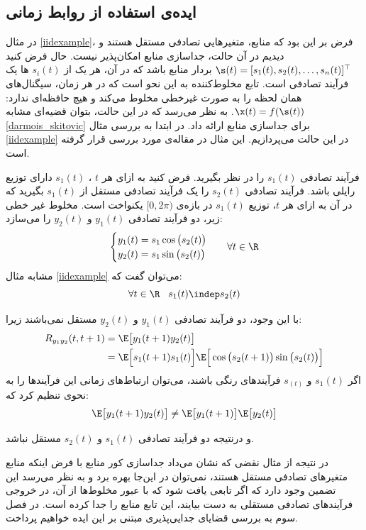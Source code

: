 \subsection{ایده‌ی استفاده از روابط زمانی}

در مثال
\eqref{iidexample}،
فرض بر این بود که منابع، متغیر‌هایی تصادفی مستقل هستند و دیدیم در آن حالت، جداسازی منابع امکان‌پذیر نیست. حال فرض کنید 
$\s(t) = [s_1(t), s_2(t), \dots, s_n(t)]^\top$
بردار منابع باشد که در آن، هر یک از
$s_i(t)$
ها یک فرآیند تصادفی است. تابع مخلوط‌کننده به این نحو است که در هر زمان، سیگنال‌های همان لحظه را به صورت غیرخطی مخلوط می‌کند و هیچ حافظه‌ای ندارد:
$\x(t) = f(\s(t))$.
به نظر می‌رسد که در این حالت، بتوان قضیه‌ای مشابه
\eqref{darmois_skitovic}
برای جداسازی منابع ارائه داد. در ابتدا به بررسی مثال 
\eqref{iidexample}
در این حالت می‌پردازیم. این مثال در مقاله‌ی 
\cite{shahram}
مورد بررسی قرار گرفته است.

\begin{example}
فرآیند تصادفی 
$s_1(t)$
را در نظر بگیرید. فرض کنید به ازای‌ هر $t$ ،
$s_1(t)$
دارای توزیع رایلی باشد. فرآیند تصادفی 
$s_2(t)$
را یک فرآیند تصادفی مستقل از 
$s_1(t)$
بگیرید که در آن به ازای هر $t$، توزیع 
$s_1(t)$
در بازه‌ی 
$[0, 2\pi)$
یکنواخت است.  مخلوط‌ غیر خطی زیر، دو فرآیند تصادفی 
$y_1(t)$
و 
$y_2(t)$
را می‌سازد:
	\begin{equation}
	\begin{cases}
	y_1(t) = s_1 \cos\big(s_2(t)\big)\\
	y_2(t) = s_1 \sin\big(s_2(t)\big)
	\end{cases}\;\;\;
	\forall t \in \R
	\end{equation}
مشابه‌ مثال 
\eqref{iidexample}
می‌توان گفت که:
$$\forall t \in \R \;\;\; s_1(t) \indep s_2(t)$$

با این وجود، دو فرآیند تصادفی 
$y_1(t)$
و 
$y_2(t)$
مستقل نمی‌باشند زیرا:
\begin{align}
R_{y_1y_2}(t, t+1) &= \E\big[{y_1(t+1)y_2(t)}\big]\\
&= \E\Big[s_1(t+1)s_1(t)\Big]
\E\Big[\cos\big(s_2(t+1)\big)\sin\big(s_2(t)\big)\Big]
\end{align}
اگر 
$s_1(t)$
و 
$s_(t)$
فرآیند‌های رنگی باشند، می‌توان ارتباط‌های زمانی این فرآیند‌ها را به نحوی تنظیم کرد که:
\begin{equation}
 \E\big[{y_1(t+1)y_2(t)}\big] \neq
  \E\big[y_1(t+1)\big] \E\big[y_2(t)\big]
\end{equation}

و درنتیجه دو فرآیند تصادفی 
$s_1(t)$
و 
$s_2(t)$
مستقل نباشد. 
\end{example}
در نتیجه از مثال نقضی که نشان‌ می‌داد جداسازی کور منابع با فرض اینکه منابع متغیر‌های تصادفی مستقل هستند، نمی‌توان در این‌جا بهره برد و به نظر می‌رسد این تضمین وجود دارد که اگر  تابعی  یافت شود که با عبور مخلوط‌ها از آن، در خروجی فرآیند‌های تصادفی مستقلی به دست بیایند، این تابع منابع را جدا کرده است. در فصل سوم به بررسی  قضایای جدایی‌پذیری مبتنی بر این ایده‌ خواهیم پرداخت.



